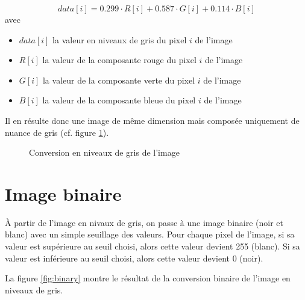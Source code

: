 \documentclass[a4paper]{article}
\begin{document}
        \begin{equation}
            data[i] = 0.299 \cdot R[i] + 0.587 \cdot G[i] + 0.114 \cdot B[i]
            \label{eq:gray_scale}
        \end{equation}
        avec
        \begin{itemize}
            \item $data[i]$ la valeur en niveaux de gris du pixel $i$ de l'image
            \item $R[i]$ la valeur de la composante rouge du pixel $i$ de l'image
            \item $G[i]$ la valeur de la composante verte du pixel $i$ de l'image
            \item $B[i]$ la valeur de la composante bleue du pixel $i$ de l'image
        \end{itemize}

        Il en résulte donc une image de même dimension mais composée uniquement de nuance de gris (cf. figure \ref{fig:gray}).

        \begin{figure}[htbp]
            \begin{center}
                \caption{Conversion en niveaux de gris de l'image}
                \label{fig:gray}
            \end{center}
        \end{figure}

    \section{Image binaire}

        À partir de l'image en nivaux de gris, on passe à une image binaire (noir et blanc) avec un simple seuillage des valeurs. Pour chaque pixel de l'image, si sa valeur est supérieure au seuil choisi, alors cette valeur devient 255 (blanc). Si sa valeur est inférieure au seuil choisi, alors cette valeur devient 0 (noir).

        La figure \ref{fig:binary} montre le résultat de la conversion binaire de l'image en niveaux de gris.
\end{document}
